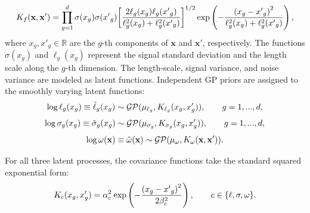 \documentclass[]{interact}
\theoremstyle{plain}%
\theoremstyle{definition}
\theoremstyle{remark}
\begin{document}
\begin{equation}
	{K_f}({\bf{x}},{\bf{x'}}) = \prod\limits_{g = 1}^d {\sigma ({x_g})\sigma ({{x'}_g}){{\left[ {\frac{{2{\ell _g}({x_g}){\ell _g}({{x'}_g})}}{{\ell _g^2({x_g}) + \ell _g^2({{x'}_g})}}} \right]}^{1/2}}} \exp \left( { - \frac{{{{({x_g} - {{x'}_g})}^2}}}{{\ell _g^2({x_g}) + \ell _g^2({{x'}_g})}}} \right),
\end{equation}
where $x_{g}, x'_{g} \in \mathbb{R}$ are the $g$-th components of $\mathbf{x}$ and $\mathbf{x}'$, respectively. The functions $\sigma(x_{g})$ and $\ell_{g}(x_{g})$ represent the signal standard deviation and the length scale along the $g$-th dimension. The length-scale, signal variance, and noise variance are modeled as latent functions. Independent GP priors are assigned to the smoothly varying latent functions:
\begin{equation}
	\log {\ell _g}({x_g}) \equiv {\tilde \ell _g}({x_g})\sim{\cal G}{\cal P}({\mu _{{\ell _g}}},{K_{{\ell _g}}}({x_g},{x'_g})),\qquad g = 1,...,d,
\end{equation}
\begin{equation}
	\log {\sigma _g}({x_g}) \equiv {\tilde \sigma _g}({x_g})\sim{\cal G}{\cal P}({\mu _{{\sigma _g}}},{K_{{\sigma _g}}}({x_g},{x'_g})),\qquad g = 1,...,d,
\end{equation}
\begin{equation}
	\log \omega ({\bf{x}}) \equiv \tilde \omega ({\bf{x}})\sim{\cal G}{\cal P}({\mu _\omega },{K_\omega }({\bf{x}},{\bf{x'}})).
\end{equation}

For all three latent processes, the covariance functions take the standard squared exponential form:
\begin{equation}
	{K_c}({x_g},{x'_g}) = \alpha _c^2{\mkern 1mu} \exp \left( { - \frac{{{{({x_g} - {{x'}_g})}^2}}}{{2\beta _c^2}}} \right),\qquad c \in \{ \ell ,\sigma ,\omega \} .
\end{equation}
\end{document}
